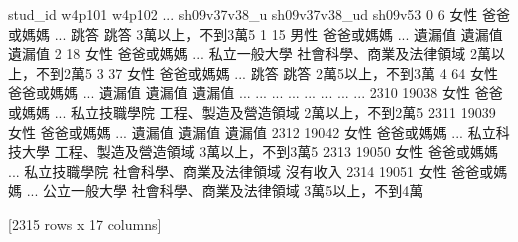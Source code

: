       stud_id w4p101 w4p102  ... sh09v37v38_u sh09v37v38_ud     sh09v53
0           6     女性  爸爸或媽媽  ...           跳答            跳答  3萬以上，不到3萬5
1          15     男性  爸爸或媽媽  ...          遺漏值           遺漏值         遺漏值
2          18     女性  爸爸或媽媽  ...       私立一般大學  社會科學、商業及法律領域  2萬以上，不到2萬5
3          37     女性  爸爸或媽媽  ...           跳答            跳答  2萬5以上，不到3萬
4          64     女性  爸爸或媽媽  ...          遺漏值           遺漏值         遺漏值
...       ...    ...    ...  ...          ...           ...         ...
2310    19038     女性  爸爸或媽媽  ...       私立技職學院    工程、製造及營造領域  2萬以上，不到2萬5
2311    19039     女性  爸爸或媽媽  ...          遺漏值           遺漏值         遺漏值
2312    19042     女性  爸爸或媽媽  ...       私立科技大學    工程、製造及營造領域  3萬以上，不到3萬5
2313    19050     女性  爸爸或媽媽  ...       私立技職學院  社會科學、商業及法律領域        沒有收入
2314    19051     女性  爸爸或媽媽  ...       公立一般大學  社會科學、商業及法律領域  3萬5以上，不到4萬

[2315 rows x 17 columns]
